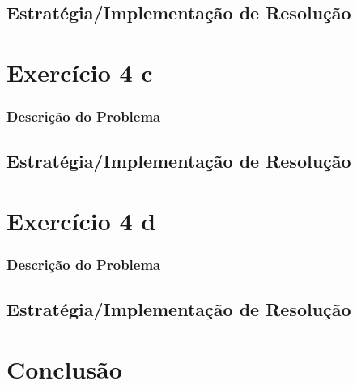 \documentclass[11pt,a4paper]{report}
\begin{document}
\section{Estratégia/Implementação de Resolução}


\chapter{Exercício 4 c}

\subsection{Descrição do Problema}


\section{Estratégia/Implementação de Resolução}


\chapter{Exercício 4 d}

\subsection{Descrição do Problema}


\section{Estratégia/Implementação de Resolução}


\chapter{Conclusão}
\end{document}
